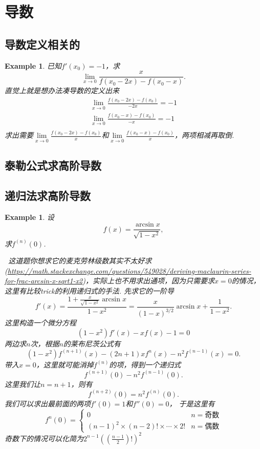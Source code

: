 \documentclass{article}
\newtheorem{example}[theorem]{Example}
\newcommand{\hints}{{\color{blue} \text{hints}}}
\begin{document}
\newpage
\section{导数}

\subsection{导数定义相关的}

\begin{example}
\rm 已知$f'(x_0) = -1$，求
$$
\lim\limits_{x \to 0} \frac{x}{f(x_0-2x)-f(x_0-x)}.
$$
\hints 直觉上就是想办法凑导数的定义出来
$$
\begin{array}{ll}
\lim\limits_{x \to 0} \frac{f(x_0-2x)-f(x_0)}{-2x} = -1 \\
\lim\limits_{x \to 0} \frac{f(x_0-x)-f(x_0)}{-x} = -1\\
\end{array}
$$
求出需要$\lim\limits_{x \to 0} \frac{f(x_0-2x)-f(x_0)}{x}$和$\lim\limits_{x \to 0} \frac{f(x_0-x)-f(x_0)}{x}$，两项相减再取倒. 
\end{example}

\subsection{泰勒公式求高阶导数}

\subsection{递归法求高阶导数}

\begin{example}
\rm 设
$$
f(x) = \frac{\arcsin x}{\sqrt{1-x^2}},
$$
求$f^{(n)}(0)$.

\hints\ 这道题你想求它的麦克劳林级数其实不太好求(\url{https://math.stackexchange.com/questions/549028/deriving-maclaurin-series-for-frac-arcsin-x-sqrt1-x2})，实际上也不用求出通项，因为只需要求$x=0$的情况，这里有比较trick的利用递归式的手法. 先求它的一阶导
$$
f'(x) = \frac{1 + \frac{x}{\sqrt{1-x^2}}\arcsin x}{1-x^2} = \frac{x}{(1-x)^{3/2}}\arcsin x + \frac{1}{1-x^2}.  
$$
这里构造一个微分方程
$$
(1-x^2)f'(x)-xf(x)-1 = 0
$$ 
两边求$n$次，根据$n$的莱布尼茨公式有
$$
(1-x^2)f^{(n+1)}(x) - (2n+1)xf^{n}(x)-n^2f^{(n-1)}(x) = 0. 
$$
带入$x=0$，这里就可能消掉$f^{(n)}$的项，得到一个递归式
$$
f^{(n+1)}(0) - n^2f^{(n-1)}(0). 
$$
这里我们让$n=n+1$，则有
$$
f^{(n+2)}(0) =  n^2f^{(n)}(0). 
$$
我们可以求出最前面的两项$f'(0) = 1$和$f''(0) = 0$， 于是这里有
$$
f^{n}(0) = \left\{ \begin{array}{ll}
0 & n=\text{奇数} \\
(n-1)^2\times(n-2)!\times\cdots\times 2! &   n=\text{偶数}
\end{array} \right.
$$
奇数下的情况可以化简为$2^{n-1}((\frac{n-1}{2})!)^2$
\end{example}
\end{document}
